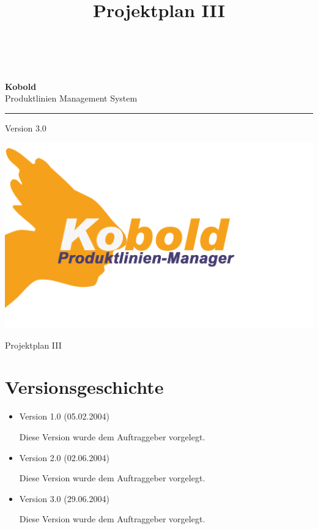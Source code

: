 \documentclass[a4paper,titlepage,12pt,ngerman]{scrbook}
\title {\huge \product\\[0.5cm]\large Projektplan III\\[0.5cm] \version
  \\[1cm] \Large \company}
\newcommand\version{Version 3.0\xspace}
\begin{document}

\begin{titlepage}
\renewcommand{\thefootnote}{\fnsymbol{footnote}}
{\Huge
\raggedright
\textbf{\bf Kobold} \\
\huge Produktlinien Management System
\rule{\textwidth}{0.75pt}
\par
}
\begin{flushleft}
\normalsize
\version
\end{flushleft}

\vspace*{3cm}
\begin{center}
\includegraphics[width=15cm]{../common/logo-color.png}
\end{center}
\vfill

{\parindent=0cm
\Huge Projektplan III
}


\setcounter{footnote}{0}
\end{titlepage}


\section*{Versionsgeschichte}

\begin{itemize}

\item Version 1.0 (05.02.2004)

  Diese Version wurde dem Auftraggeber vorgelegt.

\item Version 2.0 (02.06.2004)

  Diese Version wurde dem Auftraggeber vorgelegt.

\item Version 3.0 (29.06.2004)

  Diese Version wurde dem Auftraggeber vorgelegt.

\end{itemize}
\end{document}

